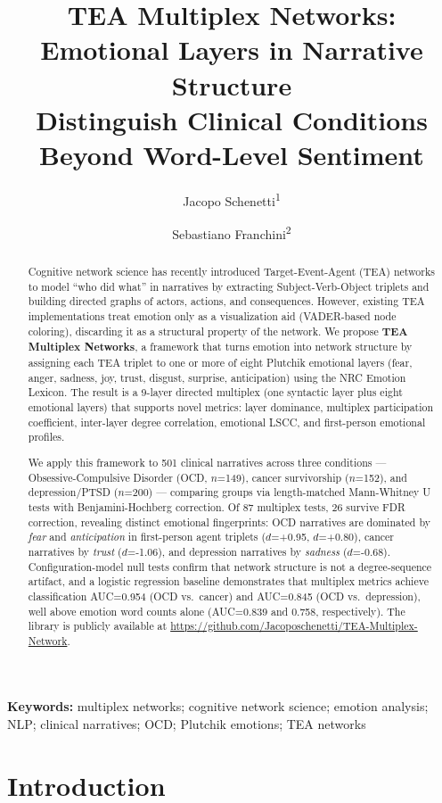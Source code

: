 \documentclass[11pt,a4paper]{article}
\title{TEA Multiplex Networks: Emotional Layers in Narrative Structure\\Distinguish Clinical Conditions Beyond Word-Level Sentiment}
\author{Jacopo Schenetti\textsuperscript{1} \and Sebastiano Franchini\textsuperscript{2}}
\date{}
\begin{document}
\maketitle

\begin{abstract}
Cognitive network science has recently introduced Target-Event-Agent (TEA) networks to model ``who did what'' in narratives by extracting Subject-Verb-Object triplets and building directed graphs of actors, actions, and consequences.
However, existing TEA implementations treat emotion only as a visualization aid (VADER-based node coloring), discarding it as a structural property of the network.
We propose \textbf{TEA Multiplex Networks}, a framework that turns emotion into network structure by assigning each TEA triplet to one or more of eight Plutchik emotional layers (fear, anger, sadness, joy, trust, disgust, surprise, anticipation) using the NRC Emotion Lexicon.
The result is a 9-layer directed multiplex (one syntactic layer plus eight emotional layers) that supports novel metrics: layer dominance, multiplex participation coefficient, inter-layer degree correlation, emotional LSCC, and first-person emotional profiles.

We apply this framework to 501 clinical narratives across three conditions --- Obsessive-Compulsive Disorder (OCD, $n$=149), cancer survivorship ($n$=152), and depression/PTSD ($n$=200) --- comparing groups via length-matched Mann-Whitney U tests with Benjamini-Hochberg correction.
Of 87 multiplex tests, 26 survive FDR correction, revealing distinct emotional fingerprints: OCD narratives are dominated by \textit{fear} and \textit{anticipation} in first-person agent triplets ($d$=+0.95, $d$=+0.80), cancer narratives by \textit{trust} ($d$=-1.06), and depression narratives by \textit{sadness} ($d$=-0.68).
Configuration-model null tests confirm that network structure is not a degree-sequence artifact, and a logistic regression baseline demonstrates that multiplex metrics achieve classification AUC=0.954 (OCD vs.\ cancer) and AUC=0.845 (OCD vs.\ depression), well above emotion word counts alone (AUC=0.839 and 0.758, respectively).
The library is publicly available at \url{https://github.com/Jacoposchenetti/TEA-Multiplex-Network}.
\end{abstract}

\textbf{Keywords:} multiplex networks; cognitive network science; emotion analysis; NLP; clinical narratives; OCD; Plutchik emotions; TEA networks

\section{Introduction}
\end{document}
